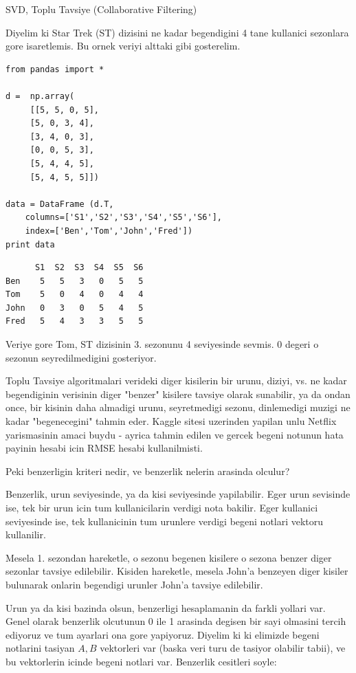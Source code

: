 \documentclass[12pt,fleqn]{article}\usepackage{../common}
\begin{document}
SVD, Toplu Tavsiye (Collaborative Filtering) 

Diyelim ki Star Trek (ST) dizisini ne kadar begendigini 4 tane
kullanici sezonlara gore isaretlemis. Bu ornek veriyi alttaki gibi
gosterelim.

\begin{verbatim}
from pandas import *

d =  np.array(
     [[5, 5, 0, 5],
     [5, 0, 3, 4],
     [3, 4, 0, 3],
     [0, 0, 5, 3],
     [5, 4, 4, 5],
     [5, 4, 5, 5]])

data = DataFrame (d.T,
    columns=['S1','S2','S3','S4','S5','S6'],
    index=['Ben','Tom','John','Fred'])
print data
\end{verbatim}

\begin{verbatim}
      S1  S2  S3  S4  S5  S6
Ben    5   5   3   0   5   5
Tom    5   0   4   0   4   4
John   0   3   0   5   4   5
Fred   5   4   3   3   5   5
\end{verbatim}

Veriye gore Tom, ST dizisinin 3. sezonunu 4 seviyesinde sevmis. 0
degeri o sezonun seyredilmedigini gosteriyor.

Toplu Tavsiye algoritmalari verideki diger kisilerin bir urunu,
diziyi, vs. ne kadar begendiginin verisinin diger "benzer" kisilere
tavsiye olarak sunabilir, ya da ondan once, bir kisinin daha almadigi
urunu, seyretmedigi sezonu, dinlemedigi muzigi ne kadar
"begenecegini" tahmin eder. Kaggle sitesi uzerinden yapilan unlu Netflix
yarismasinin amaci buydu - ayrica tahmin edilen ve gercek begeni notunun
hata payinin hesabi icin RMSE hesabi kullanilmisti.

Peki benzerligin kriteri nedir, ve benzerlik nelerin arasinda olculur?

Benzerlik, urun seviyesinde, ya da kisi seviyesinde yapilabilir. Eger
urun sevisinde ise, tek bir urun icin tum kullanicilarin verdigi nota
bakilir. Eger kullanici seviyesinde ise, tek kullanicinin tum urunlere
verdigi begeni notlari vektoru kullanilir. 

Mesela 1. sezondan hareketle, o sezonu begenen kisilere o sezona
benzer diger sezonlar tavsiye edilebilir. Kisiden hareketle, mesela
John'a benzeyen diger kisiler bulunarak onlarin begendigi urunler John'a
tavsiye edilebilir.

Urun ya da kisi bazinda olsun, benzerligi hesaplamanin da farkli
yollari var.  Genel olarak benzerlik olcutunun 0 ile 1 arasinda
degisen bir sayi olmasini tercih ediyoruz ve tum ayarlari ona gore
yapiyoruz. Diyelim ki ki elimizde begeni notlarini tasiyan $A,B$
vektorleri var (baska veri turu de tasiyor olabilir tabii), ve bu
vektorlerin icinde begeni notlari var. Benzerlik cesitleri soyle:
\end{document}
